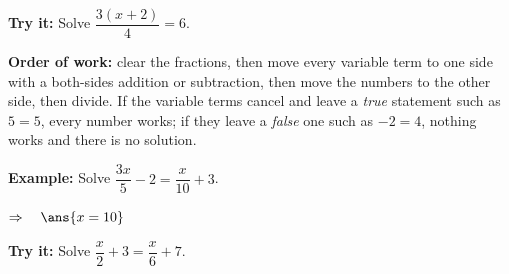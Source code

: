 \documentclass[12pt]{article}
\begin{document}
\begin{tryitbox}
\textbf{Try it:} \quad Solve $\dfrac{3(x + 2)}{4} = 6$.\\[2pt]
\end{tryitbox}


\begin{formulabox}
\textbf{Order of work:} clear the fractions, then move every variable term to one side with a
both-sides addition or subtraction, then move the numbers to the other side, then divide.
If the variable terms cancel and leave a \emph{true} statement such as $5 = 5$, every number works;
if they leave a \emph{false} one such as $-2 = 4$, nothing works and there is no solution.
\end{formulabox}

\begin{examplebox}
\textbf{Example:} \quad Solve $\dfrac{3x}{5} - 2 = \dfrac{x}{10} + 3$.

$\Rightarrow\quad \ans{x = 10}$
\end{examplebox}

\begin{tryitbox}
\textbf{Try it:} \quad Solve $\dfrac{x}{2} + 3 = \dfrac{x}{6} + 7$.\\[2pt]
\end{tryitbox}
\end{document}
